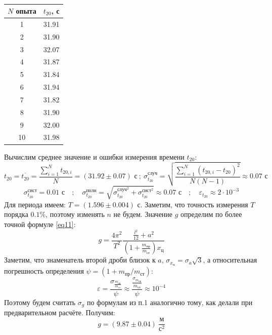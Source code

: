 \documentclass[a4paper]{article}
\begin{document}
\begin{itemize}
\begin{table}[h]
\centering
\begin{tabular}{|c|c|} 
\hline
$N$ опыта & $t_{20}$, с \\ 
\hline
1           & 31.91             \\ 
\hline
2           & 31.90             \\ 
\hline
3           & 32.07             \\ 
\hline
4           & 31.87             \\ 
\hline
5           & 31.84             \\ 
\hline
6           & 31.94             \\ 
\hline
7           & 31.82             \\ 
\hline
8           & 31.90             \\ 
\hline
9           & 32.00             \\ 
\hline
10          & 31.98             \\
\hline

\end{tabular}
\caption{}
\end{table}

Вычислим среднее значение и ошибки измерения времени $t_{20}$:
\begin{equation}
t_{20} = \overline{t_{20}} = \frac{\sum\limits_{i=1}^N t_{20, i}}{N} = (31.92 \pm 0.07) \text{ с} \ ; \ \sigma_{t_{20}}^{\text{случ}} = \sqrt{\frac{\sum\limits_{i=1}^N (t_{20, i} - t_{20})^2}{N(N-1)}} \approx 0.07 \text{ с}
\end{equation}
\begin{equation}
\sigma_{t_{20}}^{\text{сист}} = 0.01 \text{ с} \quad ; \quad \sigma_{t_{20}}^{\text{полн}} = \sqrt{\sigma_{t_{20}}^{\text{случ}^2} + \sigma_{t_{20}}^{\text{сист}^2}} \approx 0.07 \text{ с} \quad ; \quad \varepsilon_{t_{20}} \approx 2 \cdot 10^{-3} 
\end{equation}
Для периода имеем: $T = (1.596 \pm 0.004) \text{ с}$. Заметим, что точность измерения $T$ порядка $0.1\%$, поэтому изменять $n$ не будем. Значение $g$ определим по более точной формуле \eqref{eq11}:
\begin{equation}
g = \frac{4\pi^2}{T^2} \frac{\frac{l^2}{12} + a^2}{\left(1+\frac{m_{\text{пр}}}{m_{\text{ст}}}\right) x_{\text{ц}}}
\end{equation}
Заметим, что знаменатель второй дроби близок к $a$, $\sigma_{x_{\text{ц}}} = \sigma_a \sqrt{3}$, а относительная  погрешность определения $\psi = (1 + m_{\text{пр}}/m_{\text{ст}})$:
\[\varepsilon = \frac{\sigma_{\frac{m_{\text{пр}}}{m_{\text{ст}}}}}{\psi} \approx  \frac{\frac{\sigma_{m_{\text{пр}}}}{m_{\text{ст}}}}{\psi} \approx 10^{-4} \]
Поэтому будем считать $\sigma_g$ по формулам из п.1 аналогично тому, как делали при предварительном расчёте. Получим:
\[ g = (9.87 \pm 0.04) \ \frac{\text{м}}{\text{с}^2} \]


\end{itemize}
\end{document}
